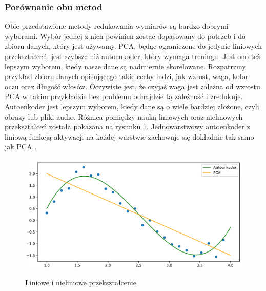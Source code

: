 \documentclass[a4paper,12pt,oneside]{book} %
\begin{document}
\subsubsection{Porównanie obu metod}
Obie przedstawione metody redukowania wymiarów są bardzo dobrymi wyborami. Wybór jednej z nich powinien zostać dopasowany do potrzeb i do zbioru danych, który jest używamy. PCA, będąc ograniczone do jedynie liniowych przekształceń, jest szybsze niż autoenkoder, który wymaga treningu. Jest ono też lepszym wyborem, kiedy nasze dane są nadmiernie skorelowane. Rozpatrzmy przykład zbioru danych opisującego takie cechy ludzi, jak wzrost, waga, kolor oczu oraz długość włosów. Oczywiste jest, że czyjaś waga jest zależna od wzrostu. PCA w takim przykładzie bez problemu odnajdzie tą zależność i zredukuje. Autoenkoder jest lepszym wyborem, kiedy dane są o wiele bardziej złożone, czyli obrazy lub pliki audio. Różnica pomiędzy nauką liniowych oraz nielinowych przekształceń została pokazana na rysunku \ref{fig:pcavsautoenkoder}.  
Jednowarstwowy autoenkoder z liniową funkcją aktywacji na każdej warstwie zachowuje się dokładnie tak samo jak PCA \cite{aevspca}.
\begin{figure}[h!]
	\centering
	\includegraphics[width=14cm]{pcavsautoencoder.pdf}
	\label{fig:pcavsautoenkoder}
	\caption{Liniowe i nieliniowe przekształcenie}
\end{figure}
\end{document}
